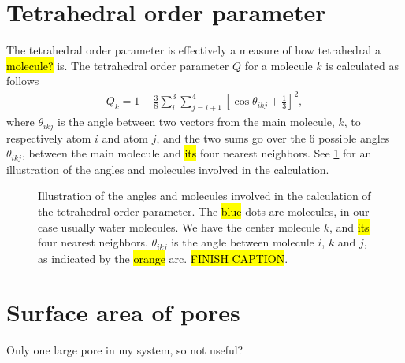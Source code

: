 \section{Tetrahedral order parameter}
The tetrahedral order parameter\cite{errington2001relationship} is effectively a measure of how tetrahedral a \hl{molecule?} is. The tetrahedral order parameter $Q$ for a molecule $k$ is calculated as follows
\begin{align*}
    Q_k = 1 - \frac{3}{8}\sum_i^3\sum_{j=i+1}^4 \left[ \cos \theta_{ikj} + \frac{1}{3} \right]^2,
\end{align*}
where $\theta_{ikj}$ is the angle between two vectors from the main molecule, $k$, to respectively atom $i$ and atom $j$, and the two sums go over the 6 possible angles $\theta_{ikj}$, between the main molecule and \hl{its} four nearest neighbors. See \cref{fig:top_tetrahedra} for an illustration of the angles and molecules involved in the calculation.
%
\begin{figure}[htpb]%
    \centering%
    \caption{%
        Illustration of the angles and molecules involved in the calculation of the tetrahedral order parameter. The \hl{blue} dots are molecules, in our case usually water molecules. We have the center molecule $k$, and \hl{its} four nearest neighbors. $\theta_{ikj}$ is the angle between molecule $i$, $k$ and $j$, as indicated by the \hl{orange} arc. \hl{FINISH CAPTION}. %
        \label{fig:top_tetrahedra}%
    }%
\end{figure}%

\FloatBarrier
\section{Surface area of pores}
    Only one large pore in my system, so not useful?
